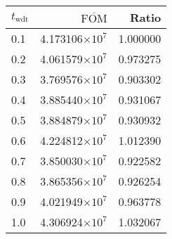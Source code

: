 \begin{tabular}{lrr}
\toprule
$t_{\mathrm{wdt}}$ & $\overline{\mathrm{FOM}}$ &    Ratio \\
\midrule
               0.1 &   4.173106$\times 10^{7}$ & 1.000000 \\
               0.2 &   4.061579$\times 10^{7}$ & 0.973275 \\
               0.3 &   3.769576$\times 10^{7}$ & 0.903302 \\
               0.4 &   3.885440$\times 10^{7}$ & 0.931067 \\
               0.5 &   3.884879$\times 10^{7}$ & 0.930932 \\
               0.6 &   4.224812$\times 10^{7}$ & 1.012390 \\
               0.7 &   3.850030$\times 10^{7}$ & 0.922582 \\
               0.8 &   3.865356$\times 10^{7}$ & 0.926254 \\
               0.9 &   4.021949$\times 10^{7}$ & 0.963778 \\
               1.0 &   4.306924$\times 10^{7}$ & 1.032067 \\
\bottomrule
\end{tabular}
